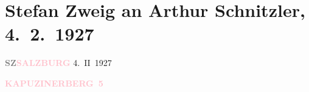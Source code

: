 

\renewcommand{\erwaehntePersonen}{Personen: Joseph Arthur de Gobineau, Baruch de Spinoza, Stefan Zweig}
\renewcommand{\erwaehnteOrte}{Orte: Paschinger Schlössl, Salzburg, Wien}
\renewcommand{\erwaehnteWerke}{Werke: Der Geist im Wort und der Geist in der Tat, Der Kampf mit dem Dämon. Hölderlin – Kleist – Nietzsche, Die Baumeister der Welt. Versuch einer Typologie des Geistes, Drei Dichter ihres Lebens. Casanova – Stendhal – Tolstoi, Drei Meister. Balzac – Dickens – Dostojewski}
\section[Stefan Zweig an Arthur Schnitzler, 4. 2. 1927]{Stefan Zweig an Arthur Schnitzler, 4. 2. 1927}
\nopagebreak{}
\rehead{ }\normalsize\beginnumbering{}
\toendnotes[C]{\smallbreak\pagebreak[2]}
\toendnotes[C]{\smallbreak}
\pstart
           {\pb}\textcolor{gray}{\textbf{SZ}}\hfill \textcolor{gray}{\textbf{\textcolor{pink}{SALZBURG}{}\ledrightnote{\textcolor{pink}{Salzburg}}}}{ }4. II 1927\pend
           
\pstart
           \raggedleft{}\textcolor{gray}{\textbf{\textcolor{pink}{KAPUZINERBERG 5}{}\ledrightnote{\textcolor{pink}{Paschinger Schlössl}}}}\pend
           
